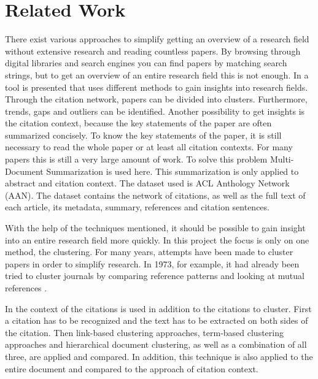 \section{Related Work}

There exist various approaches to simplify getting an overview of a research field without extensive research and reading countless papers. By browsing through digital libraries and search engines you can find papers by matching search strings, but to get an overview of an entire research field this is not enough.
In \cite{Rapid_understanding_of_scientific_paper_collections} a tool is presented that uses different methods to gain insights into research fields.
Through the citation network, papers can be divided into clusters. Furthermore, trends, gaps and outliers can be identified.
Another possibility to get insights is the citation context, because the key statements of the paper are often summarized concisely.  To know the key statements of the paper, it is still necessary to read the whole paper or at least all citation contexts. For many papers this is still a very large amount of work. To solve this problem Multi-Document Summarization is used here. This summarization is only applied to abstract and citation context. The dataset used is ACL Anthology Network (AAN).\cite{aan} The dataset contains the network of citations, as well as the full text of each article, its metadata, summary, references and citation sentences. 

With the help of the techniques mentioned, it should be possible to gain insight into an entire research field more quickly.
In this project the focus is only on one method, the clustering.
For many years, attempts have been made to cluster papers in order to simplify research. In 1973, for example, it had already been tried to cluster journals by comparing reference patterns and looking at mutual references \cite{Clustering_of_scientific_journals}.

In \cite{Document_clustering_of_scientific_texts_using_citation_contexts} the context of the citations is used in addition to the citations to cluster.
First a citation has to be recognized and the text has to be extracted on both sides of the citation. Then link-based clustering approaches, term-based clustering approaches and hierarchical document clustering, as well as a combination of all three, are applied and compared. In addition, this technique is also applied to the entire document and compared to the approach of citation context.

